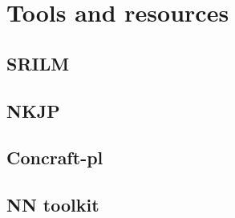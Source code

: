\chapter{Tools and resources}
\label{chapter:tools}
\section{SRILM}
\section{NKJP}
\label{section:nkjp}
\section{Concraft-pl}
\section{NN toolkit}




